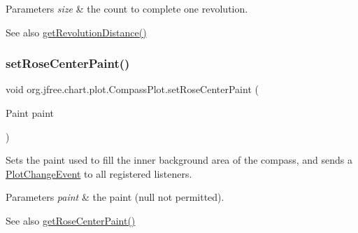 \begin{DoxyParams}{Parameters}
{\em size} & the count to complete one revolution.\\
\hline
\end{DoxyParams}
\begin{DoxySeeAlso}{See also}
\mbox{\hyperlink{classorg_1_1jfree_1_1chart_1_1plot_1_1_compass_plot_a2ef264b10a5113a67d757d908a2f4d68}{get\+Revolution\+Distance()}} 
\end{DoxySeeAlso}
\mbox{\label{classorg_1_1jfree_1_1chart_1_1plot_1_1_compass_plot_a2fc72d27007f0762ae9c6dd6af65e971}} 
\subsubsection{\texorpdfstring{set\+Rose\+Center\+Paint()}{setRoseCenterPaint()}}
{\footnotesize\ttfamily void org.\+jfree.\+chart.\+plot.\+Compass\+Plot.\+set\+Rose\+Center\+Paint (\begin{DoxyParamCaption}\item[{Paint}]{paint }\end{DoxyParamCaption})}

Sets the paint used to fill the inner background area of the compass, and sends a \mbox{\hyperlink{}{Plot\+Change\+Event}} to all registered listeners.


\begin{DoxyParams}{Parameters}
{\em paint} & the paint ({\ttfamily null} not permitted).\\
\hline
\end{DoxyParams}
\begin{DoxySeeAlso}{See also}
\mbox{\hyperlink{classorg_1_1jfree_1_1chart_1_1plot_1_1_compass_plot_a750f550a147200d68f767c7cd367876e}{get\+Rose\+Center\+Paint()}} 
\end{DoxySeeAlso}
\mbox{\label{classorg_1_1jfree_1_1chart_1_1plot_1_1_compass_plot_a4b63fbf468b95ed64c3e139bf74a365b}} 
